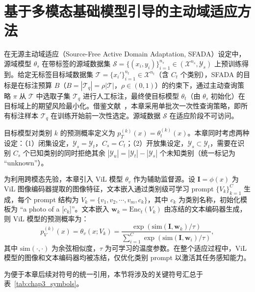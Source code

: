 \section{基于多模态基础模型引导的主动域适应方法}

\label{sec:chap3_damf}

在无源主动域适应（Source-Free Active Domain Adaptation, SFADA）设定中，源域模型 $\theta_s$ 在带标签的源域数据集 $\mathcal{S}=\{(x_i,y_i)\}_{i=1}^{n_s}\in(\mathcal{X}^{n_s},\mathcal{Y}_s)$ 上预训练得到。给定无标签目标域数据集 $\mathcal{T}=\{x_i'\}_{i=1}^{n_t}\in\mathcal{X}^{n_t}$（含 $C_t$ 个类别），SFADA 的目标是在标注预算 $B$（$B=|\mathcal{T}_q|=\rho|\mathcal{T}|$，$\rho\in(0,1)$）的约束下，通过主动查询策略 $\pi$ 从 $\mathcal{T}$ 中选取子集 $\mathcal{T}_q$ 进行人工标注，最终使目标模型 $\theta_t$（由 $\theta_s$ 初始化）在目标域上的期望风险最小化。借鉴文献~\cite{wang2023mhpl,chu2022denoised}，本章采用单批次一次性查询策略，即所有标注样本 $\mathcal{T}_q$ 在训练开始前一次性选定。源域数据 $\mathcal{S}$ 在适应阶段不可访问。

目标模型对类别 $k$ 的预测概率定义为 $p_T^{(k)}(x)=\theta_t^{(k)}(x)$。本章同时考虑两种设定：（1）闭集设定，$\mathcal{Y}_s=\mathcal{Y}_t$，$C_s=C_t$；（2）开放集设定，$\mathcal{Y}_s\subset\mathcal{Y}_t$，需要在识别 $C_s$ 个已知类别的同时拒绝其余 $|\mathcal{Y}_u|=|\mathcal{Y}_t|-|\mathcal{Y}_s|$ 个未知类别（统一标记为 ``unknown''）。

为利用跨模态先验，本章引入 ViL 模型 $\theta_v$ 作为辅助监督源。设 $\mathbf{I}=\phi(x)$ 为 ViL 图像编码器提取的图像特征，文本嵌入通过类别级可学习 prompt $\{V_k\}_{k=1}^{C}$ 生成，每个 prompt 结构为 $V_k=\{v_1,v_2,\cdots,v_m,c_k\}$，其中 $c_k$ 为类别名称，初始化模板为 ``a photo of a [$c_k$]''。文本嵌入 $\mathbf{w}_k=\mathrm{Enc}_t(V_k)$ 由冻结的文本编码器生成，则 ViL 模型的预测概率为：
\begin{equation}
p_V^{(k)}(x) = \theta_v(x; V_k) = \frac{\exp(\mathrm{sim}(\mathbf{I}, \mathbf{w}_k)/\tau)}{\sum_{i=1}^{C}\exp(\mathrm{sim}(\mathbf{I}, \mathbf{w}_i)/\tau)},
\label{eq:vil_pred}
\end{equation}
其中 $\mathrm{sim}(\cdot,\cdot)$ 为余弦相似度，$\tau$ 为可学习的温度参数。在整个适应过程中，ViL 模型的图像和文本编码器均被冻结，仅优化类别 prompt 以激活其任务感知能力。

为便于本章后续对符号的统一引用，本节将涉及的关键符号汇总于表~\ref{tab:chap3_symbols}。

